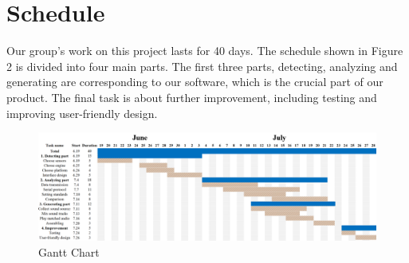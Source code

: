 \section{Schedule}
Our group's work on this project lasts for 40 days. The schedule shown in Figure 2 is divided into four main parts. The first three parts, detecting, analyzing and generating are corresponding to our software, which is the crucial part of our product. The final task is about further improvement, including testing and improving user-friendly design.
\begin{figure}
    \centering
    \includegraphics[width=13cm]{Pics/Gantt}
    \caption{Gantt Chart}
    \label{scalerStep}
\end{figure}
